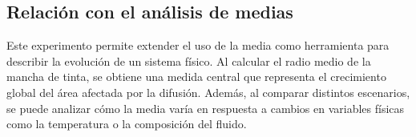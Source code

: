 \documentclass[11pt]{article}
\begin{document}
\begin{tcolorbox}[colback=blue!5!white,colframe=blue!75!black,title=Propuesta de Experimento Complementario]
\subsection*{Relación con el análisis de medias}
Este experimento permite extender el uso de la media como herramienta para describir la evolución de un sistema físico. Al calcular el radio medio de la mancha de tinta, se obtiene una medida central que representa el crecimiento global del área afectada por la difusión. Además, al comparar distintos escenarios, se puede analizar cómo la media varía en respuesta a cambios en variables físicas como la temperatura o la composición del fluido.
\end{tcolorbox}






\end{document}
